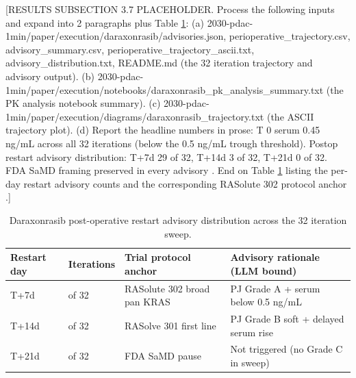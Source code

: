 [RESULTS SUBSECTION 3.7 PLACEHOLDER. Process the following inputs and expand into 2 paragraphs plus Table \ref{tab:results-daraxonrasib}:
(a) 2030-pdac-1min/paper/execution/daraxonrasib/{advisories.json, perioperative_trajectory.csv, advisory_summary.csv, perioperative_trajectory_ascii.txt, advisory_distribution.txt, README.md} (the 32 iteration trajectory and advisory output).
(b) 2030-pdac-1min/paper/execution/notebooks/daraxonrasib_pk_analysis_summary.txt (the PK analysis notebook summary).
(c) 2030-pdac-1min/paper/execution/diagrams/daraxonrasib_trajectory.txt (the ASCII trajectory plot).
(d) Report the headline numbers in prose: T 0 serum 0.45 ng/mL across all 32 iterations (below the 0.5 ng/mL trough threshold). Postop restart advisory distribution: T+7d 29 of 32, T+14d 3 of 32, T+21d 0 of 32. FDA SaMD framing preserved in every advisory \cite{fda-samd}.
End on Table \ref{tab:results-daraxonrasib} listing the per-day restart advisory counts and the corresponding RASolute 302 protocol anchor \cite{rasolute302}.]

\begin{table}[H]
\caption{Daraxonrasib post-operative restart advisory distribution across the 32 iteration sweep.}
\label{tab:results-daraxonrasib}
\centering
\begin{tabular}{>{\raggedright\arraybackslash}p{2.8cm} >{\raggedright\arraybackslash}p{2.4cm} >{\raggedright\arraybackslash}p{3.0cm} >{\raggedright\arraybackslash}p{4.6cm}}
\toprule
\textbf{Restart day} & \textbf{Iterations} & \textbf{Trial protocol anchor} & \textbf{Advisory rationale (LLM bound)} \\
\midrule
  T+7d & 29 of 32 & RASolute 302 broad pan KRAS \cite{rasolute302} & PJ Grade A + serum below 0.5 ng/mL \\
  T+14d & 3 of 32 & RASolve 301 first line \cite{rasolve301} & PJ Grade B soft + delayed serum rise \\
  T+21d & 0 of 32 & FDA SaMD pause \cite{fda-samd} & Not triggered (no Grade C in sweep) \\
\bottomrule
\end{tabular}
\end{table}
